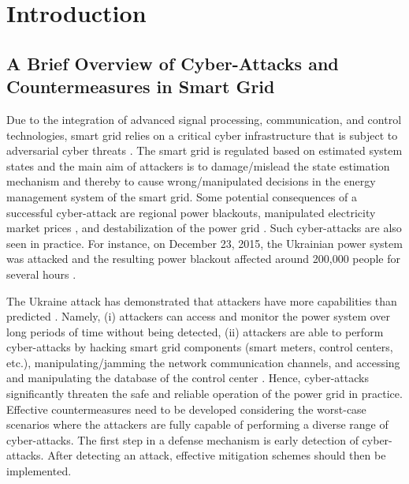 \documentclass[onecolumn]{IEEEtran}
\begin{document}
\section{Introduction}

\subsection{A Brief Overview of Cyber-Attacks and Countermeasures in Smart Grid}

Due to the integration of advanced signal processing, communication, and control technologies, smart grid relies on a critical cyber infrastructure that is subject to adversarial cyber threats \cite{HHe16,Liang16,wang2013cyber,yan2012survey}. The smart grid is regulated based on estimated system states and the main aim of attackers is to damage/mislead the state estimation mechanism and thereby to cause wrong/manipulated decisions in the energy management system of the smart grid. Some potential consequences of a successful cyber-attack are regional power blackouts, {manipulated electricity market prices \cite{Xie10,moslemi2017}, and destabilization of the power grid \cite{ayar2017}.} Such cyber-attacks are also seen in practice. For instance, on December 23, 2015, the Ukrainian power system was attacked and the resulting power blackout affected around 200,000 people for several hours \cite{GLiang17}.

The Ukraine attack has demonstrated that attackers have more capabilities than predicted \cite{GLiang17}. Namely, (i) attackers can access and monitor the power system over long periods of time without being detected, (ii) attackers are able to perform cyber-attacks by hacking smart grid components (smart meters, control centers, etc.), manipulating/jamming the network communication channels, and accessing and manipulating the database of the control center \cite{GLiang17,Amin09,Liang16}. Hence, cyber-attacks significantly threaten the safe and reliable operation of the power grid in practice. Effective countermeasures need to be developed considering the worst-case scenarios where the attackers are fully capable of performing a diverse range of cyber-attacks. The first step in a defense mechanism is early detection of cyber-attacks. After detecting an attack, effective mitigation schemes should then be implemented.
\end{document}
